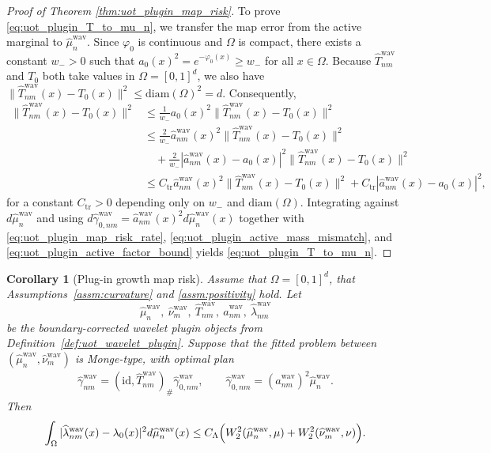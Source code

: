 \documentclass[11pt,reqno]{amsart}
\newtheorem{corollary}[theorem]{Corollary}
\theoremstyle{definition}
\renewcommand{\hat}{\widehat}
\begin{document}
\begin{proof}[Proof of Theorem \ref{thm:uot_plugin_map_risk}]
To prove \eqref{eq:uot_plugin_T_to_mu_n}, we transfer the map error from the active marginal to $\hat\mu_n^{\mathrm{wav}}$. Since $\varphi_0$ is continuous and $\Omega$ is compact, there exists a constant $w_->0$ such that $a_0(x)^2=e^{-\varphi_0(x)}\ge w_-$ for all $x\in\Omega$. Because $\hat T_{nm}^{\mathrm{wav}}$ and $T_0$ both take values in $\Omega=[0,1]^d$, we also have $\|\hat T_{nm}^{\mathrm{wav}}(x)-T_0(x)\|^2\le \mathrm{diam}(\Omega)^2 = d$. Consequently,
\begin{align*}
    \|\hat T_{nm}^{\mathrm{wav}}(x)-T_0(x)\|^2
    &\le \frac{1}{w_-} a_0(x)^2 \|\hat T_{nm}^{\mathrm{wav}}(x)-T_0(x)\|^2 \\
    &\le \frac{2}{w_-}\hat a_{nm}^{\mathrm{wav}}(x)^2\|\hat T_{nm}^{\mathrm{wav}}(x)-T_0(x)\|^2 \\
    &\quad + \frac{2}{w_-}|\hat a_{nm}^{\mathrm{wav}}(x)-a_0(x)|^2\|\hat T_{nm}^{\mathrm{wav}}(x)-T_0(x)\|^2 \\
    &\le
    C_{\mathrm{tr}} \hat a_{nm}^{\mathrm{wav}}(x)^2 \|\hat T_{nm}^{\mathrm{wav}}(x)-T_0(x)\|^2
    + C_{\mathrm{tr}} |\hat a_{nm}^{\mathrm{wav}}(x)-a_0(x)|^2,
\end{align*}
for a constant $C_{\mathrm{tr}}>0$ depending only on $w_-$ and $\mathrm{diam}(\Omega)$. Integrating against $d\hat\mu_n^{\mathrm{wav}}$ and using $d\hat\gamma_{0,nm}^{\mathrm{wav}}=\hat a_{nm}^{\mathrm{wav}}(x)^2 d\hat\mu_n^{\mathrm{wav}}(x)$ together with \eqref{eq:uot_plugin_map_risk_rate}, \eqref{eq:uot_plugin_active_mass_mismatch}, and \eqref{eq:uot_plugin_active_factor_bound} yields \eqref{eq:uot_plugin_T_to_mu_n}.
\end{proof}

\begin{corollary}[Plug-in growth map risk]
\label{cor:uot_plugin_growth_risk}
Assume that $\Omega=[0,1]^d$, that Assumptions~\ref{assm:curvature} and \ref{assm:positivity} hold.
Let
\[
    \hat\mu_n^{\mathrm{wav}},\ \hat\nu_m^{\mathrm{wav}},\ \hat T_{nm}^{\mathrm{wav}},\ \hat a_{nm}^{\mathrm{wav}},\ \hat\lambda_{nm}^{\mathrm{wav}}
\]
be the boundary-corrected wavelet plugin objects from Definition~\ref{def:uot_wavelet_plugin}. Suppose that the fitted problem between $(\hat\mu_n^{\mathrm{wav}},\hat\nu_m^{\mathrm{wav}})$ is Monge-type, with optimal plan
\begin{align*}
    \hat\gamma_{nm}^{\mathrm{wav}} = (\mathrm{id},\hat T_{nm}^{\mathrm{wav}})_\#\hat\gamma_{0,nm}^{\mathrm{wav}},
    \qquad
    \hat\gamma_{0,nm}^{\mathrm{wav}} = (\hat a_{nm}^{\mathrm{wav}})^2\hat\mu_n^{\mathrm{wav}}.
\end{align*}
Then
\begin{align}
\label{eq:uot_plugin_growth_risk}
    \int_{\Omega}
    |\hat\lambda_{nm}^{\mathrm{wav}}(x)-\lambda_0(x)|^2 d\hat\mu_n^{\mathrm{wav}}(x)
    \le
    C_\Lambda\Bigl(
        W_2^2(\hat\mu_n^{\mathrm{wav}},\mu)
        +
        W_2^2(\hat\nu_m^{\mathrm{wav}},\nu)
    \Bigr).
\end{align}
\end{corollary}
\end{document}

